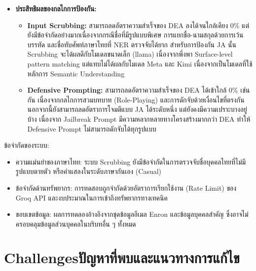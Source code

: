 \begin{sloppypar}
\begin{itemize}
\item \textbf{ประสิทธิผลของกลไกการป้องกัน:}
\begin{itemize}
    \item \textbf{Input Scrubbing:} สามารถลดอัตราความสำเร็จของ DEA ลงได้จนใกล้เคียง 0\% แต่ยังมีข้อจำกัดอย่างมากเนื่องจากกรณีชื่อที่มีรูปแบบพิเศษ การแยกชื่อ-นามสกุลด้วยการเว้นบรรทัด และชื่อทับศัพท์ภาษาไทยที่ NER ตรวจจับได้ยาก สำหรับการป้องกัน JA นั้น Scrubbing จะได้ผลดีกับโมเดลขนาดเล็ก (llama) เนื่องจากพึ่งพา Surface-level pattern matching แต่แทบไม่ได้ผลกับโมเดล Meta และ Kimi เนื่องจากเป็นโมเดลที่ใช้หลักการ Semantic Understanding
    \item \textbf{Defensive Prompting:} สามารถลดอัตราความสำเร็จของ DEA ได้เข้าใกล้ 0\% เช่นกัน เนื่องจากกลไกการสวมบทบาท (Role-Playing) และการดักจับด้วยเงื่อนไขที่ตรงกัน นอกจากนี้ยังสามารถลดอัตราการโจมตีแบบ JA ได้ระดับหนึ่ง แต่ยังคงมีความเปราะบางอยู่บ้าง เนื่องจาก Jailbreak Prompt มีความหลากหลายทางโครงสร้างมากกว่า DEA ทำให้ Defensive Prompt ไม่สามารถดักจับได้ทุกรูปแบบ
\end{itemize}
\end{itemize}
\end{sloppypar}

ข้อจำกัดของระบบ:
\begin{itemize}
    \item ความแม่นยำของภาษาไทย: ระบบ Scrubbing ยังมีข้อจำกัดในการตรวจจับชื่อบุคคลไทยที่ไม่มีรูปแบบตายตัว หรือคำแสลงในระดับภาษากันเอง (Casual)
    \item ข้อจำกัดด้านทรัพยากร: การทดสอบถูกจำกัดด้วยอัตราการเรียกใช้งาน (Rate Limit) ของ Groq API และงบประมาณในการเข้าถึงทรัพยากรทางเทคนิค
    \item ขอบเขตข้อมูล: ผลการทดลองอ้างอิงจากชุดข้อมูลอีเมล Enron และข้อมูลบุคคลสำคัญ ซึ่งอาจไม่ครอบคลุมข้อมูลส่วนบุคคลในบริบทอื่น ๆ ทั้งหมด
\end{itemize}

\section{\ifenglish Challenges\else ปัญหาที่พบและแนวทางการแก้ไข\fi}

